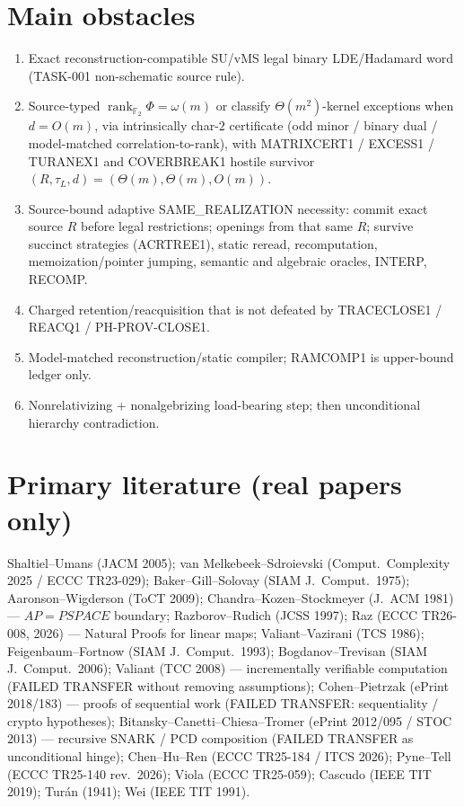 \documentclass[11pt]{article}
\begin{document}
\section*{Main obstacles}
\begin{enumerate}
\item Exact reconstruction-compatible SU/vMS legal binary LDE/Hadamard word (TASK-001 non-schematic
source rule).
\item Source-typed $\operatorname{rank}_{\mathbb F_2}\Phi=\omega(m)$ or classify $\Theta(m^2)$-kernel
exceptions when $d=O(m)$, via intrinsically char-$2$ certificate (odd minor / binary dual /
model-matched correlation-to-rank), with MATRIXCERT1 / EXCESS1 / TURANEX1 and COVERBREAK1
hostile survivor $(R,\tau_L,d)=(\Theta(m),\Theta(m),O(m))$.
\item Source-bound adaptive SAME\_REALIZATION necessity: commit exact source $R$ before legal
restrictions; openings from that same $R$; survive succinct strategies (ACRTREE1), static reread,
recomputation, memoization/pointer jumping, semantic and algebraic oracles, INTERP, RECOMP.
\item Charged retention/reacquisition that is not defeated by TRACECLOSE1 / REACQ1 /
PH-PROV-CLOSE1.
\item Model-matched reconstruction/static compiler; RAMCOMP1 is upper-bound ledger only.
\item Nonrelativizing + nonalgebrizing load-bearing step; then unconditional hierarchy contradiction.
\end{enumerate}

\section*{Primary literature (real papers only)}
Shaltiel--Umans (JACM 2005); van Melkebeek--Sdroievski (Comput.\ Complexity 2025 / ECCC TR23-029);
Baker--Gill--Solovay (SIAM J.\ Comput.\ 1975); Aaronson--Wigderson (ToCT 2009);
Chandra--Kozen--Stockmeyer (J.\ ACM 1981) --- $AP=PSPACE$ boundary;
Razborov--Rudich (JCSS 1997); Raz (ECCC TR26-008, 2026) --- Natural Proofs for linear maps;
Valiant--Vazirani (TCS 1986); Feigenbaum--Fortnow (SIAM J.\ Comput.\ 1993);
Bogdanov--Trevisan (SIAM J.\ Comput.\ 2006);
Valiant (TCC 2008) --- incrementally verifiable computation (FAILED TRANSFER without removing
assumptions);
Cohen--Pietrzak (ePrint 2018/183) --- proofs of sequential work (FAILED TRANSFER: sequentiality /
crypto hypotheses);
Bitansky--Canetti--Chiesa--Tromer (ePrint 2012/095 / STOC 2013) --- recursive SNARK / PCD composition
(FAILED TRANSFER as unconditional hinge);
Chen--Hu--Ren (ECCC TR25-184 / ITCS 2026); Pyne--Tell (ECCC TR25-140 rev.\ 2026); Viola (ECCC TR25-059);
Cascudo (IEEE TIT 2019); Tur\'an (1941); Wei (IEEE TIT 1991).
\end{document}
